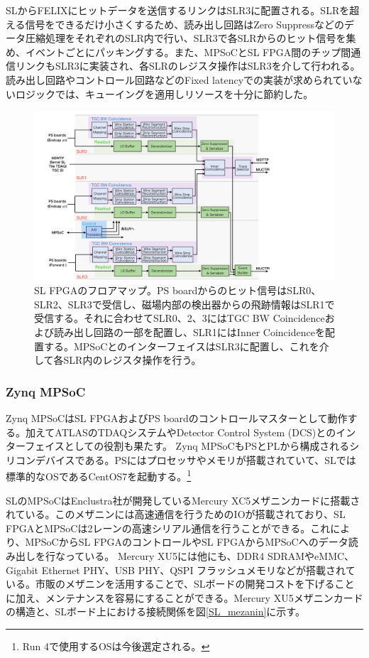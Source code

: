 SLからFELIXにヒットデータを送信するリンクはSLR3に配置される。SLRを超える信号をできるだけ小さくするため、読み出し回路はZero Suppressなどのデータ圧縮処理をそれぞれのSLR内で行い、SLR3で各SLRからのヒット信号を集め、イベントごとにパッキングする。また、MPSoCとSL FPGA間のチップ間通信リンクもSLR3に実装され、各SLRのレジスタ操作はSLR3を介して行われる。読み出し回路やコントロール回路などのFixed latencyでの実装が求められていないロジックでは、キューイングを適用しリソースを十分に節約した。

\begin{figure} 
\centering
\includegraphics[width=16cm]{fig/Intro/SL_floor.pdf}
\caption[SL FPGAのフロアマップ]{SL FPGAのフロアマップ。PS boardからのヒット信号はSLR0、SLR2、SLR3で受信し、磁場内部の検出器からの飛跡情報はSLR1で受信する。それに合わせてSLR0、2、3にはTGC BW Coincidenceおよび読み出し回路の一部を配置し、SLR1にはInner Coincidenceを配置する。MPSoCとのインターフェイスはSLR3に配置し、これを介して各SLR内のレジスタ操作を行う。}
\label{SL_floor}
\end{figure}



    \subsubsection*{Zynq MPSoC}
Zynq MPSoCはSL FPGAおよびPS boardのコントロールマスターとして動作する。加えてATLASのTDAQシステムやDetector Control System (DCS)とのインターフェイスとしての役割も果たす。
Zynq MPSoCもPSとPLから構成されるシリコンデバイスである。PSにはプロセッサやメモリが搭載されていて、SLでは標準的なOSであるCentOS7を起動する。\footnote{Run 4で使用するOSは今後選定される。}

SLのMPSoCはEnclustra社が開発しているMercury XC5メザニンカードに搭載されている。このメザニンには高速通信を行うためのIOが搭載されており、SL FPGAとMPSoCは2レーンの高速シリアル通信を行うことができる。これにより、MPSoCからSL FPGAのコントロールやSL FPGAからMPSoCへのデータ読み出しを行なっている。
Mercury XU5には他にも、DDR4 SDRAMやeMMC、Gigabit Ethernet PHY、USB PHY、QSPI フラッシュメモリなどが搭載されている。市販のメザニンを活用することで、SLボードの開発コストを下げることに加え、メンテナンスを容易にすることができる。Mercury XU5メザニンカードの構造と、SLボード上における接続関係を図\ref{SL_mezanin}に示す。

